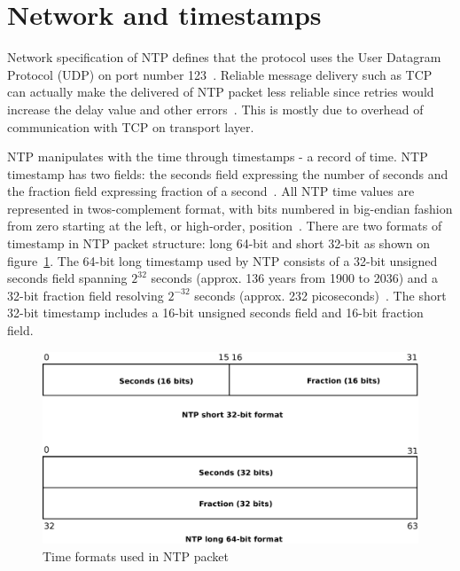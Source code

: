 
\section{Network and timestamps}\label{sec:ntp-network}
Network specification of NTP defines that
the protocol uses the User Datagram Protocol (UDP) on port number 123~\cite{ianna-ports,rfc5905}.
Reliable message delivery such as TCP can actually make the delivered of
NTP packet less reliable since retries
would increase the delay value and other errors~\cite{rfc5905}.
This is mostly due to overhead of communication with TCP on transport layer.

NTP manipulates with the time through timestamps - a record of time.
NTP timestamp has two fields: the seconds field expressing the number of seconds
and the fraction field expressing fraction of a second~\cite{rfc5905}.
All NTP time values are represented in twos-complement format, with
bits numbered in big-endian fashion from zero starting at the left, or high-order, position~\cite{rfc5905}. 
There are two formats of timestamp in NTP packet structure:
long 64-bit and short 32-bit as shown on figure~\ref{fig:ntp-timestamps}.
The 64-bit long timestamp used by NTP consists of a 32-bit unsigned seconds
field spanning $2^{32}$ seconds (approx. 136 years from 1900 to 2036) and a 32-bit fraction field resolving
$2^{-32}$ seconds (approx. 232 picoseconds)~\cite{rfc5905}.
The short 32-bit timestamp includes a 16-bit unsigned seconds field
and 16-bit fraction field.

\begin{figure}
	\centering
	\includegraphics[width=13cm,keepaspectratio]{fig/ntp-timestamps.pdf}
	\caption{Time formats used in NTP packet}
	\label{fig:ntp-timestamps}
	\bigskip
\end{figure}

